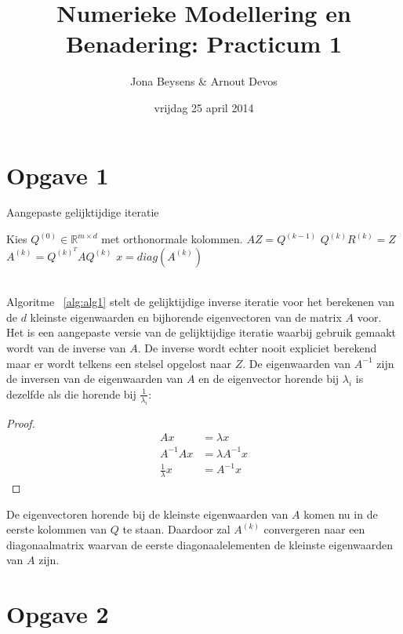 \documentclass[a4paper]{article}
\title{Numerieke Modellering en Benadering: Practicum 1}
\author{Jona Beysens \& Arnout Devos}
\date{vrijdag 25 april 2014}
\newcommand{\opgave}[1]{\section*{Opgave #1}}
\begin{document}
\maketitle

\opgave{1}

\begin{algorithm}
 
 \caption{Aangepaste gelijktijdige iteratie}
\begin{algorithmic}[1]
\State Kies $Q^{(0)} \in \mathbb{R}^{m\times d}$ met orthonormale kolommen.
    \State $AZ=Q^{(k-1)}$
    \State $Q^{(k)}R^{(k)}=Z$
    \State $A^{(k)}=Q^{(k)^{T}}AQ^{(k)}$
\EndFor
\State $x = diag(A^{(k)})$
\end{algorithmic}
\label{alg:alg1}
\end{algorithm}
\ \\
Algoritme ~\ref{alg:alg1} stelt de gelijktijdige inverse iteratie voor het berekenen van de $d$ kleinste eigenwaarden en bijhorende eigenvectoren van de matrix $A$ voor. Het is een aangepaste versie van de gelijktijdige iteratie waarbij gebruik gemaakt wordt van de inverse van $A$. De inverse wordt echter nooit expliciet berekend maar er wordt telkens een stelsel opgelost naar $Z$. De eigenwaarden van $A^{-1}$ zijn de inversen van de eigenwaarden van $A$ en de eigenvector horende bij $\lambda_i$ is dezelfde als die horende bij $\frac{1}{\lambda_i}$:
\begin{proof}
\begin{align}
	Ax &= \lambda x \label{eq1}\\ 
    A^{-1}Ax &= \lambda A^{-1}x \label{eq2}\\
    \frac{1}{\lambda}x &= A^{-1}x \label{eq:const1}
\end{align}
\end{proof}
De eigenvectoren horende bij de kleinste eigenwaarden van $A$ komen nu in de eerste kolommen van $Q$ te staan. Daardoor zal $A^{(k)}$ convergeren naar een diagonaalmatrix waarvan de eerste diagonaalelementen de kleinste eigenwaarden van $A$ zijn.
\newpage
\opgave{2}
\end{document}
